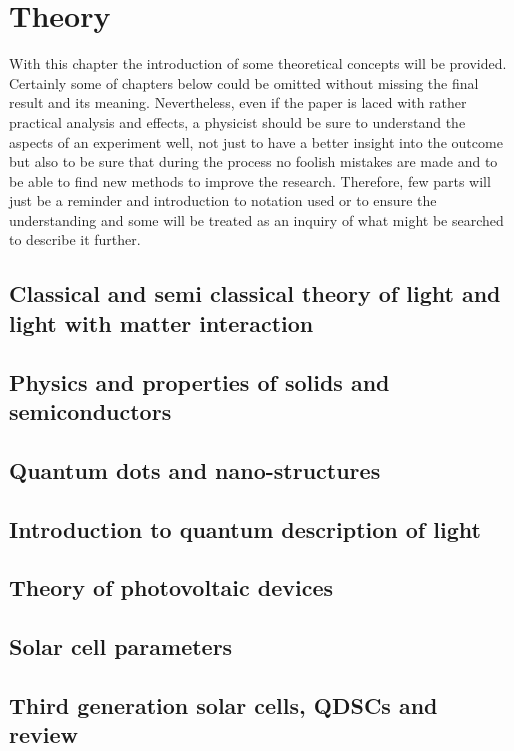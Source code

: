 \chapter{Theory}

With this chapter the introduction of some theoretical concepts will be provided. Certainly some of chapters below could be omitted without missing the final result and its meaning. Nevertheless, even if the paper is laced with rather practical analysis and effects, a physicist should be sure to understand the aspects of an experiment well, not just to have a better insight into the outcome but also to be sure that during the process no foolish mistakes are made and to be able to find new methods to improve the research. Therefore, few parts will just be a reminder and introduction to notation used or to ensure the understanding and some will be treated as an inquiry of what might be searched to describe it further. 
\section{Classical and semi classical theory of light and light with matter interaction}

\section{Physics and properties of solids and semiconductors}

\section{Quantum dots and nano-structures}

\section{Introduction to quantum description of light}

\section{Theory of photovoltaic devices}

\section{Solar cell parameters}

\section{Third generation solar cells, QDSCs and review}
